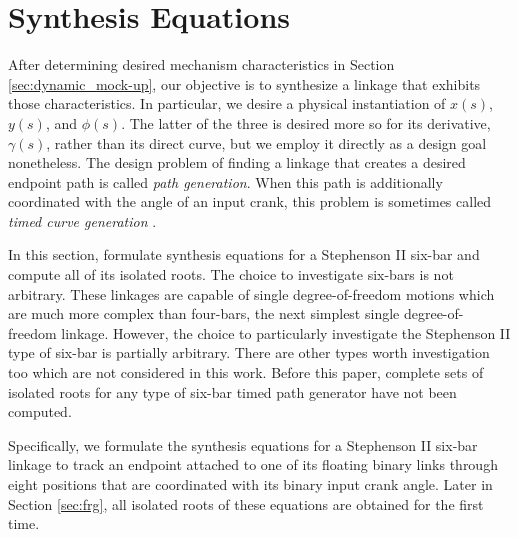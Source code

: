 \documentclass[journal]{IEEEtran}
\begin{document}
\section{Synthesis Equations}
\label{sec:synth_eq}

After determining desired mechanism characteristics in Section \ref{sec:dynamic_mock-up}, our objective is to synthesize a linkage that exhibits those characteristics.
In particular, we desire a physical instantiation of $x(s)$, $y(s)$, and $\phi(s)$.
The latter of the three is desired more so for its derivative, $\gamma(s)$, rather than its direct curve, but we employ it directly as a design goal nonetheless.
The design problem of finding a linkage that creates a desired endpoint path is called \textit{path generation}.
When this path is additionally coordinated with the angle of an input crank, this problem is sometimes called \textit{timed curve generation} \cite{dijksmanMotionGeometryMechanisms1976}.


In this section, formulate synthesis equations for a Stephenson II six-bar and compute all of its isolated roots.  The choice to investigate six-bars is not arbitrary.  These linkages are capable of single degree-of-freedom motions which are much more complex than four-bars, the next simplest single degree-of-freedom linkage.  However, the choice to particularly investigate the Stephenson II type of six-bar is partially arbitrary.  There are other types worth investigation too which are not considered in this work.  Before this paper, complete sets of isolated roots for any type of six-bar timed path generator have not been computed.


Specifically, we formulate the synthesis equations for a Stephenson II six-bar linkage to track an endpoint attached to one of its floating binary links through eight positions that are coordinated with its binary input crank angle.
Later in Section \ref{sec:frg}, all isolated roots of these equations are obtained for the first time.
\end{document}
